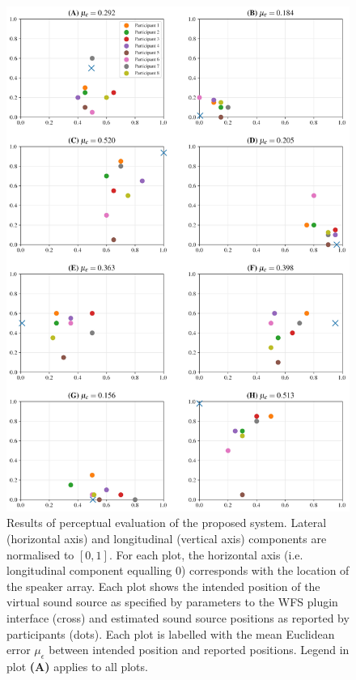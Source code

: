 \begin{figure}[h!]
    \centering
    \includegraphics[width=.75\textwidth]{figures/subjective}
    \caption{
        Results of perceptual evaluation of the proposed system.
        Lateral (horizontal axis) and longitudinal (vertical axis) components
        are normalised to $[0, 1]$.
        For each plot, the horizontal axis (i.e. longitudinal component
        equalling 0) corresponds with the location of the speaker array.
        Each plot shows the intended position of the virtual sound source as
        specified by parameters to the WFS plugin interface (cross) and
        estimated sound source positions as reported by participants (dots).
        Each plot is labelled with the mean Euclidean error $\mu_\epsilon$
        between intended position and reported positions.
        Legend in plot \textbf{(A)} applies to all plots.
    }
    \label{fig:perceptual}
\end{figure}

